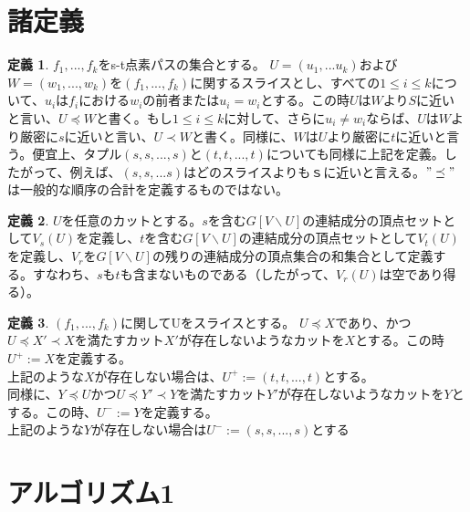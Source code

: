 \documentclass{jarticle}
\theoremstyle{definition}
\newtheorem{definition}{定義}
\begin{document}
\section*{諸定義}
\begin{definition}
  ${f_1,...,f_k}$をs-t点素パスの集合とする。
  $U=(u_1,...u_k)$および$W=(w_1,...,w_k)$を$(f_1,...,f_k)$に関するスライスとし、すべての$1\leq i\leq k$について、$u_i$は$f_i$における$w_i$の前者または$u_i=w_i$とする。この時$U$は$W$より$S$に近いと言い、$U\preceq W$と書く。もし$1 \leq i \leq k$に対して、さらに$u_i \neq w_i$ならば、$U$は$W$より厳密に$s$に近いと言い、$U \prec W$と書く。同様に、$W$は$U$より厳密に$t$に近いと言う。便宜上、タプル$(s,s,...,s)$と$(t,t,...,t)$についても同様に上記を定義。したがって、例えば、$(s,s,...s)$はどのスライスよりもｓに近いと言える。$"\preceq"$は一般的な順序の合計を定義するものではない。
\end{definition}

\begin{definition}
  $U$を任意のカットとする。$s$を含む$G [V\backslash U]$の連結成分の頂点セットとして$V_s(U)$を定義し、$t$を含む$G[V\backslash U]$の連結成分の頂点セットとして$V_t(U)$を定義し、$V_r$を$G[V \backslash U]$の残りの連結成分の頂点集合の和集合として定義する。すなわち、$s$も$t$も含まないものである（したがって、$V_r(U)$は空であり得る）。
\end{definition}

\begin{definition}
  $(f_1,...,f_k)$に関してUをスライスとする。
  $U\preceq X$であり、かつ$U\preceq X'\prec X$を満たすカット$X'$が存在しないようなカットを$X$とする。この時$U^+:=X$を定義する。\\
  上記のような$X$が存在しない場合は、$U^+:=(t,t,...,t)$とする。\\
  同様に、$Y\preceq U$かつ$U\preceq Y'\prec Y$を満たすカット$Y'$が存在しないようなカットを$Y$とする。この時、$U^-:=Y$を定義する。\\
  上記のような$Y$が存在しない場合は$U^-:=(s,s,...,s)$とする 
\end{definition}

\section*{アルゴリズム1}
\end{document}
